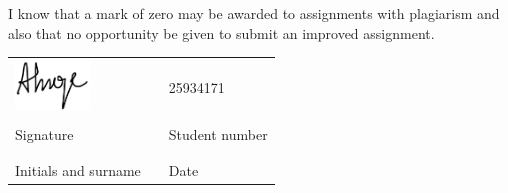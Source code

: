 \documentclass[12pt,a4paper]{article}
\makeatletter
\let\theauthor\@author
\let\thedate\@date
\makeatother
\begin{document}
I know that a mark of zero may be awarded to assignments with plagiarism and also that no opportunity be given to submit an improved assignment.
\vspace{1cm}
\begin{table}[ht]
	\begin{center}
		\begin{tabular*}{15.5cm}{@{\extracolsep{\fill}}lll}
				\includegraphics[width=2cm]{Signature.jpeg} & & 25934171\\
				\makebox[8cm]{\hrulefill} & & \makebox[6cm]{\hrulefill}\\
				Signature & & Student number\\[1cm]
				\theauthor & & \thedate\\
				\makebox[8cm]{\hrulefill} & & \makebox[6cm]{\hrulefill}\\ 
				Initials and surname & & Date \\
			\end{tabular*}
		\end{center}
	\end{table}
	
	\newpage
\end{document}

